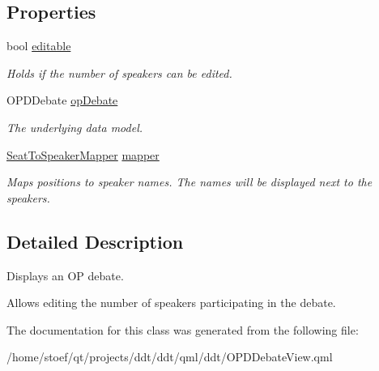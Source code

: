 \subsection*{Properties}
\begin{DoxyCompactItemize}
\item 
\hypertarget{classOPDDebateView_abe79925c1c6e2c9cf8ed5bbdb37e5754}{bool \hyperlink{classOPDDebateView_abe79925c1c6e2c9cf8ed5bbdb37e5754}{editable}}\label{classOPDDebateView_abe79925c1c6e2c9cf8ed5bbdb37e5754}

\begin{DoxyCompactList}\small\item\em Holds if the number of speakers can be edited. \end{DoxyCompactList}\item 
\hypertarget{classOPDDebateView_a86367cec3e13cad756ffaccae8aa6aab}{O\-P\-D\-Debate \hyperlink{classOPDDebateView_a86367cec3e13cad756ffaccae8aa6aab}{op\-Debate}}\label{classOPDDebateView_a86367cec3e13cad756ffaccae8aa6aab}

\begin{DoxyCompactList}\small\item\em The underlying data model. \end{DoxyCompactList}\item 
\hypertarget{classOPDDebateView_a51f818917bd4c385d65fbfe1f83317e3}{\hyperlink{classSeatToSpeakerMapper}{Seat\-To\-Speaker\-Mapper} \hyperlink{classOPDDebateView_a51f818917bd4c385d65fbfe1f83317e3}{mapper}}\label{classOPDDebateView_a51f818917bd4c385d65fbfe1f83317e3}

\begin{DoxyCompactList}\small\item\em Maps positions to speaker names. The names will be displayed next to the speakers. \end{DoxyCompactList}\end{DoxyCompactItemize}


\subsection{Detailed Description}
Displays an O\-P debate. 

Allows editing the number of speakers participating in the debate. 

The documentation for this class was generated from the following file\-:\begin{DoxyCompactItemize}
\item 
/home/stoef/qt/projects/ddt/ddt/qml/ddt/O\-P\-D\-Debate\-View.\-qml\end{DoxyCompactItemize}
